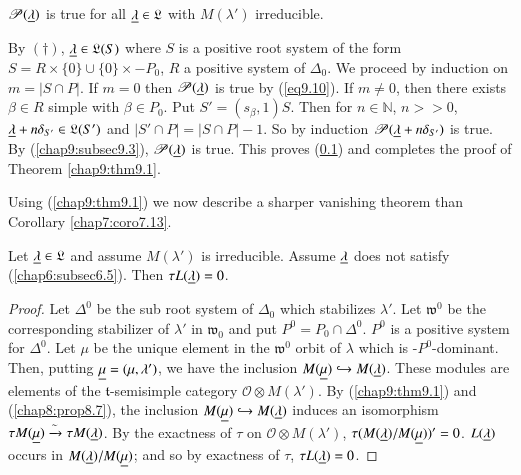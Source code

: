 \setcounter{subsection}{12}
\subsection{}\label{chap9:subsec9.13}
$\mathscr{P}(\underline{\lambda})$ is true for all $\underline{\lambda} \in
\mathfrak{L}$ with $M(\lambda')$ irreducible. 

By $(\dagger)$, $\underline{\lambda} \in \mathfrak{L}(S)$ where $S$ is a
positive root system of the form $S= R\times \{0\} \cup \{0\} \times
-P_0$, $R$ a positive system of $\Delta_0$. We proceed by induction on
$m = |S \cap P|$. If $m=0$ then $\mathscr{P}(\underline{\lambda})$ is true by
(\ref{eq9.10}). If $m \neq 0$, then there exists $\beta \in R$ simple with
$\beta \in P_0$. Put $S' = (s_\beta, 1)S$. Then for $n \in
\mathbb{N}$, $n >> 0$, $\underline{\lambda } + n \delta_{S'} \in \mathfrak{L}
(S')$ and $|S' \cap P| = |S \cap P | -1$. So by induction $\mathscr{P}
(\underline{\lambda} + n \delta_{S'})$ is true. By (\ref{chap9:subsec9.3}), $\mathscr{P}
(\underline{\lambda})$ is true. This proves (\ref{chap9:subsec9.13}) and
completes the proof of Theorem \ref{chap9:thm9.1}.

Using (\ref{chap9:thm9.1}) we now describe a sharper vanishing theorem than\break
Corollary \ref{chap7:coro7.13}.

\setcounter{prop}{13}
\begin{prop}\label{chap9:prop9.14}
Let $\underline{\lambda} \in \mathfrak{L}$ and assume $M(\lambda')$ is
irreducible. Assume $\underline{\lambda}$ does not satisfy
(\ref{chap6:subsec6.5}). Then $\tau L(\underline{\lambda}) = 0$.  
\end{prop}

\begin{proof}
Let $\Delta^0$ be the sub root system of $\Delta_0$ which stabilizes
$\lambda'$. Let $\mathfrak{w}^0$ be the corresponding stabilizer of
$\lambda'$ in $\mathfrak{w}_0$ and put $P^0 = P_0 \cap \Delta^0
$. $P^0$ is a positive system for $\Delta^0$. Let $\mu$ be the unique
element in the $\mathfrak{w}^0$ orbit of $\lambda$ which is
-$P^0$-dominant. Then, putting $\underline{\mu} = (\mu, \lambda')$, we have
the inclusion $M(\underline{\mu}) \hookrightarrow M(\underline{\lambda})$. These
modules are elements of the $\mathfrak{t}$-semisimple category
$\mathscr{O} \otimes M(\lambda')$. By (\ref{chap9:thm9.1}) and
(\ref{chap8:prop8.7}), the inclusion 
$M(\underline{\mu}) \hookrightarrow M(\underline{\lambda})$ induces an isomorphism
$\tau M(\underline{\mu}) \xrightarrow{\sim} \tau M (\underline{\lambda})$. By the exactness of $\tau$ on $\mathscr{O} 
\otimes M(\lambda')$, $\tau (M(\underline{\lambda})/M(\underline{\mu}))'
=0$. $L(\underline{\lambda})$ occurs in $M(\underline{\lambda})/ M (\underline{\mu})$; and so
by exactness of $\tau$, $\tau L(\underline{\lambda}) = 0$. 
\end{proof}

